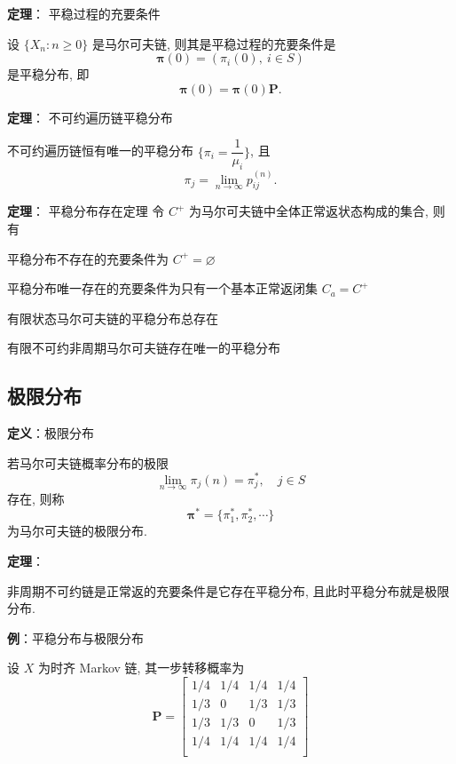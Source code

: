 \documentclass[openany]{ctexbook}
\theoremstyle{kaiti}
\theoremstyle{normal}
\begin{document}
\textbf{定理}： 平稳过程的充要条件

设 $\{X_n:n\geqslant0\}$ 是马尔可夫链, 则其是平稳过程的充要条件是
\begin{equation}
  \bm{\pi}(0)=(\pi_i(0),~i\in S)
\end{equation}
是平稳分布, 即
\begin{equation}
  \bm{\pi}(0)=\bm{\pi}(0)\bm{P}.
\end{equation}

\textbf{定理}： 不可约遍历链平稳分布

不可约遍历链恒有唯一的平稳分布 $\Big\{\pi_i=\dfrac{1}{\mu_i}\Big\}$, 且
\begin{equation}
  \pi_j=\lim_{n\to\infty}p_{ij}^{(n)}.
\end{equation}

\textbf{定理}： 平稳分布存在定理
令 $C^+$ 为马尔可夫链中全体正常返状态构成的集合, 则有

平稳分布不存在的充要条件为 $C^+=\varnothing$

平稳分布唯一存在的充要条件为只有一个基本正常返闭集 $C_a=C^+$

有限状态马尔可夫链的平稳分布总存在

有限不可约非周期马尔可夫链存在唯一的平稳分布

\subsection{极限分布}

\textbf{定义}：极限分布

若马尔可夫链概率分布的极限
\begin{equation}
  \lim_{n\to\infty}\pi_j(n)=\pi_j^*,\quad j\in S
\end{equation}
存在, 则称
\begin{equation}
  \bm{\pi}^*=\{\pi_1^*,\pi_2^*,\cdots\}
\end{equation}
为马尔可夫链的极限分布.

\textbf{定理}：

非周期不可约链是正常返的充要条件是它存在平稳分布, 且此时平稳分布就是极限分布.

\textbf{例}：平稳分布与极限分布

设 $X$ 为时齐 Markov 链, 其一步转移概率为
\begin{equation}
  \bm{P}=
  \begin{bmatrix}
    1/4 & 1/4 & 1/4 & 1/4 \\
    1/3 &  0  & 1/3 & 1/3 \\
    1/3 & 1/3 &  0  & 1/3 \\
    1/4 & 1/4 & 1/4 & 1/4 \\
  \end{bmatrix}
\end{equation}
\end{document}
